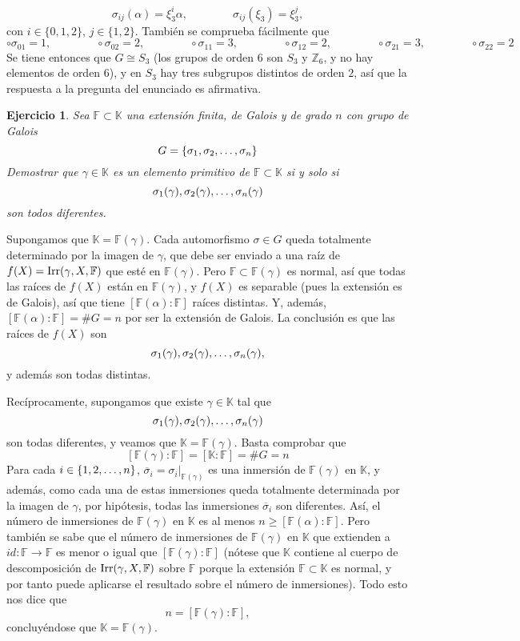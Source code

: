 \documentclass[11pt]{report}
\makeatletter
\renewenvironment{proof}[1][\proofname]{\par
  \pushQED{\qed}%
  \normalfont \topsep\z@skip %
  \trivlist
  \item[\hskip\labelsep
        \itshape
    #1\@addpunct{.}]\ignorespaces
}{%
  \popQED\endtrivlist\@endpefalse
}
\newcommand{\Z}{\mathbb Z}
\newcommand{\F}{\mathbb F}
\newcommand{\K}{\mathbb K}
\newtheorem{ejercicio}{Ejercicio}
\makeatother
\begin{document}
\begin{proof}
\begin{enumerate}
    \[\sigma_{ij}(\alpha) = \xi_3^i \alpha, \qquad \qquad \sigma_{ij}(\xi_3) = \xi_3^j,\]
    con $i \in \{0,1,2\}$, $j \in \{1,2\}$. También se comprueba fácilmente que
    \[\circ \sigma_{01} = 1, \qquad \qquad \circ \sigma_{02} = 2, \qquad \qquad \circ \sigma_{11} = 3, \qquad \qquad \circ \sigma_{12} = 2, \qquad \qquad \circ \sigma_{21} = 3, \qquad \qquad \circ \sigma_{22} = 2\]
    Se tiene entonces que $G \cong S_3$ (los grupos de orden $6$ son $S_3$ y $\Z_6$, y no hay elementos de orden $6$), y en $S_3$ hay tres subgrupos distintos de orden $2$, así que la respuesta a la pregunta del enunciado es afirmativa. \qedhere
\end{enumerate}
\end{proof}

\begin{ejercicio}
    Sea $\F \subset \K$ una extensión finita, de Galois y de grado $n$ con grupo de Galois \[G=\{\sigma_1,\sigma_2,\mathellipsis,\sigma_n\}\] Demostrar que $\gamma \in \K$ es un elemento primitivo de $\F \subset \K$ si y solo si
    \[\sigma_1(\gamma), \sigma_2(\gamma),\mathellipsis,\sigma_n(\gamma)\]
    son todos diferentes.
\end{ejercicio}

\begin{proof}
Supongamos que $\K = \F(\gamma)$. Cada automorfismo $\sigma \in G$ queda totalmente determinado por la imagen de $\gamma$, que debe ser enviado a una raíz de $f(X)=\textup{Irr}(\gamma,X,\F)$ que esté en $\F(\gamma)$. Pero $\F \subset \F(\gamma)$ es normal, así que todas las raíces de $f(X)$ están en $\F(\gamma)$, y $f(X)$ es separable (pues la extensión es de Galois), así que tiene $[\F(\alpha)\colon \F]$ raíces distintas. Y, además, $[\F(\alpha) \colon \F] = \#G = n$ por ser la extensión de Galois. La conclusión es que las raíces de $f(X)$ son
\[\sigma_1(\gamma), \sigma_2(\gamma),\mathellipsis,\sigma_n(\gamma),\]
y además son todas distintas.

Recíprocamente, supongamos que existe $\gamma \in \K$ tal que 
\[\sigma_1(\gamma), \sigma_2(\gamma),\mathellipsis,\sigma_n(\gamma)\]
son todas diferentes, y veamos que $\K = \F(\gamma)$. Basta comprobar que \[[\F(\gamma) \colon \F] =[\K \colon \F] = \#G = n\] Para cada $i \in \{1,2,\mathellipsis,n\}$, $\overline{\sigma}_i=\sigma_i \big|_{\F(\gamma)}$ es una inmersión de $\F(\gamma)$ en $\K$, y además, como cada una de estas inmersiones queda totalmente determinada por la imagen de $\gamma$, por hipótesis, todas las inmersiones $\overline{\sigma}_i$ son diferentes. Así, el número de inmersiones de $\F(\gamma)$ en $\K$ es al menos $n \geq [\F(\alpha) \colon \F]$. Pero también se sabe que el número de inmersiones de $\F(\gamma)$ en $\K$ que extienden a $id \colon \F \to \F$ es menor o igual que $[\F(\gamma) \colon \F]$ (nótese que $\K$ contiene al cuerpo de descomposición de $\textup{Irr}(\gamma,X,\F)$ sobre $\F$ porque la extensión $\F \subset \K$ es normal, y por tanto puede aplicarse el resultado sobre el número de inmersiones). Todo esto nos dice que \[n = [\F(\gamma) \colon \F],\] concluyéndose que $\K = \F(\gamma)$.
\end{proof}
\end{document}
